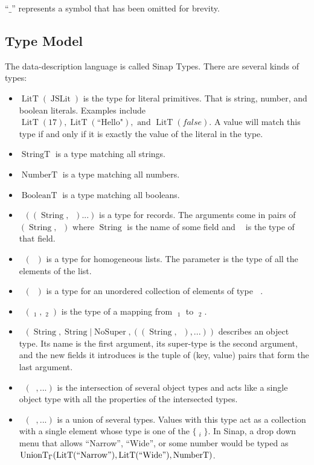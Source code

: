 \documentclass{article}
\DeclareMathOperator{\StringT}{StringT}
\DeclareMathOperator{\NumberT}{NumberT}
\DeclareMathOperator{\BooleanT}{BooleanT}
\DeclareMathOperator{\LitT}{LitT}
\DeclareMathOperator{\JSLit}{JSLit}
\DeclareMathOperator{\RecT}{RecT_\Gamma}
\DeclareMathOperator{\ObjT}{ObjT_\Gamma}
\DeclareMathOperator{\ListT}{ListT_\Gamma}
\DeclareMathOperator{\SetT}{SetT_\Gamma}
\DeclareMathOperator{\MapT}{MapT_\Gamma}
\DeclareMathOperator{\UnionT}{UnionT_\Gamma}
\DeclareMathOperator{\InterT}{InterT_\Gamma}
\DeclareMathOperator{\String}{String}
\DeclareMathOperator{\Type}{Type_\Gamma}
\DeclareMathOperator{\NoSuper}{NoSuper}
\begin{document}
``\(\_\)'' represents a symbol that has been omitted for brevity.

\subsection{Type Model}
The data-description language is called Sinap Types. There are 
several kinds of types:

\begin{itemize}
    \item \(\LitT(\JSLit)\) is the type for literal primitives. That is
    string, number, and boolean literals. 
    Examples include \(\LitT(17), \LitT(\text{``Hello"}), \text{ and } 
    \LitT(false)\). A value will match this type if and only if it is
    exactly the value of the literal in the type. 
    \item \(\StringT\) is a type matching all strings.
    \item \(\NumberT\) is a type matching all numbers.
    \item \(\BooleanT\) is a type matching all booleans.
    \item \(\RecT((\String, \Type)...)\) is a type for records. 
    The arguments come in pairs of \((\String, \Type)\) where
    \(\String\) is the name of some field and \(\Type\) is the
    type of that field.
    \item \(\ListT(\Type)\) is a type for homogeneous lists. The
    parameter is the type of all the elements of the list. 
    \item \(\SetT(\Type)\) is a type for an unordered collection
    of elements of type \(\Type\).
    \item \(\MapT(\Type_1, \Type_2)\) is the type of a mapping from 
    \(\Type_1\) to \(\Type_2\).
    \item \(\ObjT(\String, \String | \NoSuper, ((\String, \Type), ...))\)
    describes an object type. Its name is the first argument, 
    its super-type is the second argument, and the new fields 
    it introduces is the tuple of (key, value) pairs that form the
    last argument. 
    \item \(\InterT(\ObjT,  ...)\) is the intersection of several 
    object types and acts like a single object type with all the 
    properties of the intersected types. 
    \item \(\UnionT(\Type, ...)\) is a union of several types. 
    Values with this type act as a collection with a single element
    whose type is one of the \(\{\Type_i\}\). In Sinap, a drop down 
    menu that allows ``Narrow'', ``Wide'', or some number would be 
    typed as \(\UnionT(\LitT(``\text{Narrow}"), \LitT(``\text{Wide}"),
     \NumberT)\).
\end{itemize}
\end{document}
